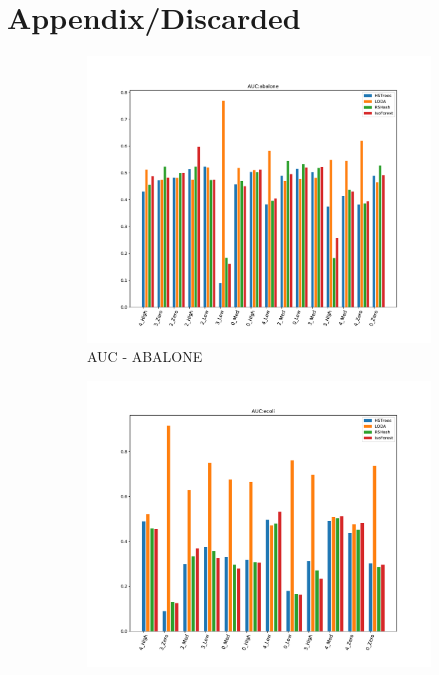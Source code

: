 \section{Appendix/Discarded}
\begin{figure}[ht!]
    \centering
    \begin{subfigure}[t]{0.32\textwidth}
        \centering
        \includegraphics[width=\linewidth]{fig/baseline/abalone.pdf}
        \caption{AUC - ABALONE}
    \end{subfigure}
    \hfill
    \begin{subfigure}[t]{0.32\textwidth}
        \centering
        \includegraphics[width=\linewidth]{fig/baseline/ecoli.pdf}

\end{subfigure}
\end{figure}
